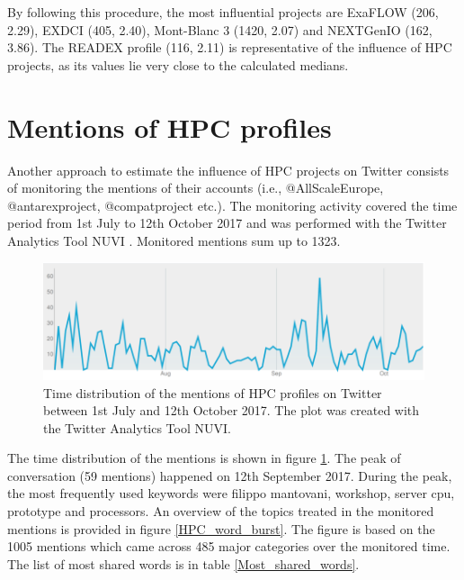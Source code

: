 By following this procedure, the most influential projects are ExaFLOW (206, 2.29), EXDCI (405, 2.40), Mont-Blanc 3 (1420, 2.07) and NEXTGenIO (162, 3.86). The READEX profile (116, 2.11) is representative of the influence of HPC projects, as its values lie very close to the calculated medians.

\section{Mentions of HPC profiles} \label{Mentions_of_HPC_profiles} 
Another approach to estimate the influence of HPC projects on Twitter consists of monitoring the mentions of their accounts (i.e., @AllScaleEurope, @antarex\textunderscore project, @compatproject etc.). The monitoring activity covered the time period from 1st July to 12th October 2017 and was performed with the Twitter Analytics Tool NUVI \cite{NUVI}. Monitored mentions sum up to 1323. 

\begin{figure}[!t] 
 \begin{center}
 \includegraphics[scale=0.4]{Images/NUVI_time_distribution.png}
 \caption{Time distribution of the mentions of HPC profiles on Twitter between 1st July and 12th October 2017. The plot was created with the Twitter Analytics Tool NUVI.}
 \label{NUVI_time_distribution}
 \end{center}
\end{figure}

The time distribution of the mentions is shown in figure \ref{NUVI_time_distribution}. The peak of conversation (59 mentions) happened on 12th September 2017. During the peak, the most frequently used keywords were filippo mantovani, workshop, server cpu, prototype and processors. An overview of the topics treated in the monitored mentions is provided in figure \ref{HPC_word_burst}. The figure is based on the 1005 mentions which came across 485 major categories over the monitored time. The list of most shared words is in table \ref{Most_shared_words}.

